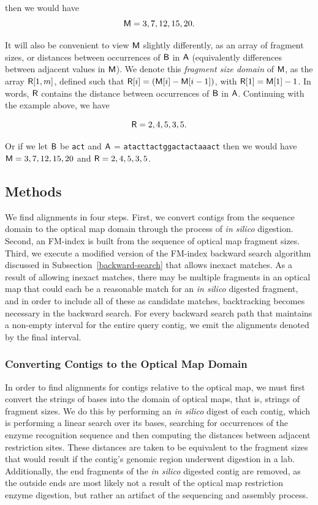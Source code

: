 then we would have
$$\mbox{\rm {\sf M}} = 3,7,12,15,20.$$

It will also be convenient to view $\mbox{\rm {\sf M}}$ slightly differently, as an array of fragment
sizes, or distances between occurrences of $\mathsf{B}$ in $\mathsf{A}$ (equivalently differences
between adjacent values in $\mbox{\rm {\sf M}}$). We denote this \emph{fragment size domain} of $\mbox{\rm {\sf M}}$,
as the array $\mbox{\rm {\sf R}}[1,m]$, defined such that $\mbox{\rm {\sf R}}[i] = (\mbox{\rm {\sf M}}[i]-\mbox{\rm {\sf M}}[i-1])$, with $\mbox{\rm {\sf R}}[1] = \mbox{\rm {\sf M}}[1]-1$.
In words, $\mbox{\rm {\sf R}}$ contains the distance between occurrences of $\mathsf{B}$ in $\mathsf{A}$.
Continuing with the example above, we have

$$\mbox{\rm {\sf R}} = 2,4,5,3,5.$$

Or if we let $\mathsf{B}$ be {\tt act} and  $\mathsf{A}$  = {\tt atacttactggactactaaact} then we would have $\mbox{\rm {\sf M}} = 3,7,12,15,20$ and $\mbox{\rm {\sf R}} = 2,4,5,3,5$.






\subsection{Methods}
\label{sec-methods-twin}



We find alignments in four steps.  First, we convert contigs from the sequence domain to the optical map domain through the process of \emph{in silico} digestion. Second, an FM-index is built from the sequence of optical map fragment sizes. Third, we execute a modified version of the FM-index backward search algorithm discussed in Subsection~\ref{backward-search} that allows inexact matches.
As a result of allowing inexact matches, there may be multiple fragments in an optical map that could each be a reasonable match for an \emph{in silico} digested fragment, and in order to include all of these as candidate matches, backtracking becomes necessary in the backward search.
For every backward search path that maintains a non-empty interval for the entire query contig, we emit the alignments denoted by the final interval.

\subsubsection{Converting Contigs to the Optical Map Domain}

In order to find alignments for contigs relative to the optical map, we must first convert the strings of bases into the domain of optical maps, that is, strings of fragment sizes.
We do this by performing an \emph{in silico} digest of each contig, which is performing a linear search over its bases, searching for occurrences of the enzyme recognition sequence and then computing the distances between adjacent restriction sites.
These distances are taken to be equivalent to the fragment sizes that would result if the contig's genomic region underwent digestion in a lab.
Additionally, the end fragments of the \emph{in silico} digested contig are removed, as the outside ends are most likely not a result of the optical map restriction enzyme digestion, but rather an artifact of the sequencing and assembly process.


